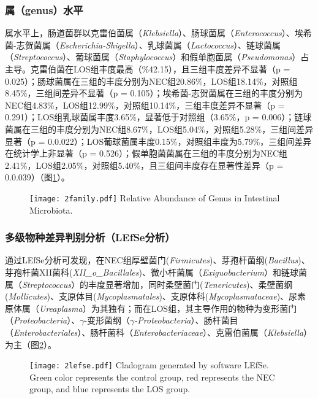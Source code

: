 {{    \subsubsection{属（genus）水平}
    属水平上，肠道菌群以克雷伯菌属（\textit{Klebsiella}）、肠球菌属（\textit{Enterococcus}）、埃希菌-志贺菌属（\textit{Escherichia-Shigella}）、乳球菌属（\textit{Lactococcus}）、链球菌属（\textit{Streptococcus}）、葡球菌属（\textit{Staphylococcus}）和假单胞菌属（\textit{Pseudomonas}）占主导。克雷伯菌在LOS组丰度最高（\%42.15），且三组丰度差异不显著（p = 0.025）；肠球菌属在三组的丰度分别为NEC组20.86\%，LOS组18.14\%，对照组8.45\%，三组间差异不显著（p = 0.105）；埃希菌-志贺菌属在三组的丰度分别为NEC组4.83\%，LOS组12.99\%，对照组10.14\%，三组丰度差异不显著（p = 0.291）；LOS组乳球菌属丰度3.65\%，显著低于对照组（3.65\%，p = 0.006）；链球菌属在三组的丰度分别为NEC组8.67\%，LOS组5.04\%，对照组5.28\%，三组间差异显著（p = 0.0.022）；LOS葡球菌属丰度0.15\%，对照组丰度为5.79\%，三组间差异在统计学上非显著（p = 0.526）；假单胞菌菌属在三组的丰度分别为NEC组2.41\%，LOS组2.05\%，对照组5.40\%，且三组间丰度存在显著性差异（p = 0.0.039）（图\ref{fig:2genus}）。
      \begin{figure}[!htp]
        \centering
        \texttt{[image: 2family.pdf]}
          {Relative Abundance of Genus in Intestinal Microbiota.}
        \label{fig:2genus}
      \end{figure}

      \subsubsection{多级物种差异判别分析（LEfSe分析）}
      通过LEfSe分析可发现，在NEC组厚壁菌门(\textit{Firmicutes})、芽孢杆菌纲(\textit{Bacillus})、芽孢杆菌XII菌科(\textit{XII\_o\_Bacillales})、微小杆菌属（\textit{Exiguobacterium}）和链球菌属（\textit{Streptococcus}）的丰度显著增加，同时柔壁菌门(\textit{Tenericutes})、柔壁菌纲(\textit{Mollicutes})、支原体目(\textit{Mycoplasmatales})、支原体科(\textit{Mycoplasmataceae})、尿素原体属（\textit{Ureaplasma}）为其独有；而在LOS组，其主导作用的物种为变形菌门（\textit{Proteobacteria}）、$\gamma$-变形菌纲（\textit{$\gamma$-Proteobacteria}）、肠杆菌目（\textit{Enterobacteriales}）、肠杆菌科（\textit{Enterobacteriaceae}）、克雷伯菌属（\textit{Klebsiella}）为主（图\ref{fig:2lefse}）。
        \begin{figure}[!htp]
          \centering
          \texttt{[image: 2lefse.pdf]}
            {Cladogram generated by software LEfSe. Green color represents the control group, red represents the NEC group, and blue represents the LOS group.}
          \label{fig:2lefse}
        \end{figure}

}}
